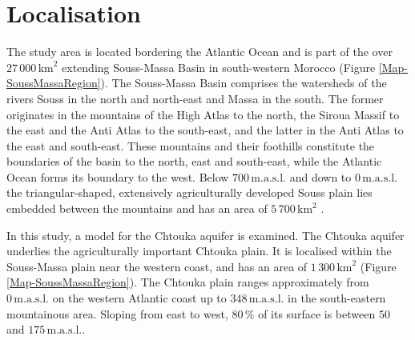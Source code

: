 \section{Localisation}

The study area is located bordering the Atlantic Ocean and is part of the over $27 \, 000 \, \textrm{km}^2$ extending Souss-Massa Basin in south-western Morocco (Figure \ref{Map-SoussMassaRegion}). 
The Souss-Massa Basin comprises the watersheds of the rivers Souss in the north and north-east and Massa in the south. 
The former originates in the mountains of the High Atlas to the north, the Siroua Massif to the east and the Anti Atlas to the south-east, and the latter in the Anti Atlas to the east and south-east. 
These mountains and their foothills constitute the boundaries of the basin to the north, east and south-east, while the Atlantic Ocean forms its boundary to the west. 
Below $700 \, \textrm{m.a.s.l.}$ and down to $0 \, \textrm{m.a.s.l.}$ the triangular-shaped, extensively agriculturally developed Souss plain lies embedded between the mountains and has an area of $5 \, 700 \, \textrm{km}^2$ \parencite{Choukr.2017}.
    
In this study, a model for the Chtouka aquifer is examined. 
The Chtouka aquifer underlies the agriculturally important Chtouka plain. 
It is localised within the Souss-Massa plain near the western coast, and has an area of $1 \, 300 \, \textrm{km}^2$ (Figure \ref{Map-SoussMassaRegion}). 
The Chtouka plain ranges approximately from $0 \, \textrm{m.a.s.l.}$ on the western Atlantic coast up to $348 \, \textrm{m.a.s.l.}$ in the south-eastern mountainous area. 
Sloping from east to west, $80 \, \%$ of its surface is between $50$ and $175 \, \textrm{m.a.s.l.}$.

